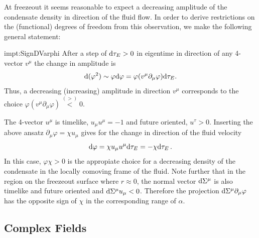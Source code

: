 At freezeout it seems reasonable to expect a decreasing amplitude of the condensate density in direction of the fluid flow. In order to derive restrictions on the (functional) degrees of freedom from this observation, we make the following general statement:
\begin{impt}{impt:SignDVarphi}
    After a step of ${\text{d}\tau_E>0}$ in eigentime in direction of any 4-vector $v^\mu$ the change in amplitude is
    \begin{equation}
        \text{d}(\varphi^2)\sim\varphi\text{d}\varphi=\varphi(v^\mu\partial_\mu\varphi)\text{d}\tau_E.
    \end{equation}
    Thus, a decreasing (increasing) amplitude in direction $v^\mu$ corresponds to the choice ${\varphi(v^\mu\partial_\mu\varphi)\overset{(>)}{<}0}$.
\end{impt}

The 4-vector $u^\mu$ is timelike, ${u_\mu u^\mu=-1}$ and future oriented, $u^\tau>0$. Inserting the above ansatz ${\partial_\mu\varphi=\chi u_\mu}$ gives for the change in direction of the fluid velocity
\begin{equation}
    \text{d}\varphi=\chi u_\mu u^\mu\text{d}\tau_E=-\chi\text{d}\tau_E\,.
\end{equation}
In this case, ${\varphi\chi>0}$ is the appropiate choice for a decreasing density of the condensate in the locally comoving frame of the fluid. Note further that in the region on the freezeout surface where $r\approx 0$, the normal vector ${\text{d}\Sigma^\mu}$ is also timelike and future oriented and ${\text{d}\Sigma^\mu u_\mu<0}$. Therefore the projection ${\text{d}\Sigma^\mu\partial_\mu\varphi}$ has the opposite sign of $\chi$ in the corresponding range of $\alpha$.

\subsection{Complex Fields}


